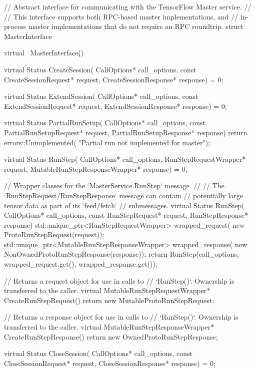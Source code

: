 \begin{content}
\begin{leftbar}
\begin{c++}
// Abstract interface for communicating with the TensorFlow Master service.
//
// This interface supports both RPC-based master implementations, and
// in-process master implementations that do not require an RPC roundtrip.
struct MasterInterface {
  virtual ~MasterInterface() {}
  
  virtual Status CreateSession(
      CallOptions* call_options,
      const CreateSessionRequest* request,
      CreateSessionResponse* response) = 0;

  virtual Status ExtendSession(
      CallOptions* call_options,
      const ExtendSessionRequest* request,
      ExtendSessionResponse* response) = 0;

  virtual Status PartialRunSetup(
      CallOptions* call_options,
      const PartialRunSetupRequest* request,
      PartialRunSetupResponse* response) {
    return errors::Unimplemented(
      "Partial run not implemented for master");
  }

  virtual Status RunStep(
      CallOptions* call_options,
      RunStepRequestWrapper* request,
      MutableRunStepResponseWrapper* response) = 0;

  // Wrapper classes for the `MasterService.RunStep` message.
  //
  // The `RunStepRequest/RunStepResponse` message can contain 
  // potentially large tensor data as part of its `feed/fetch` 
  // submessages.
  virtual Status RunStep(
    CallOptions* call_options,
    const RunStepRequest* request,
    RunStepResponse* response) {
    std::unique_ptr<RunStepRequestWrapper> wrapped_request(
        new ProtoRunStepRequest(request));
    std::unique_ptr<MutableRunStepResponseWrapper> wrapped_response(
        new NonOwnedProtoRunStepResponse(response));
    return RunStep(call_options, 
        wrapped_request.get(), 
        wrapped_response.get());
  }

  // Returns a request object for use in calls to
  // `RunStep()`. Ownership is transferred to the caller.
  virtual MutableRunStepRequestWrapper* CreateRunStepRequest() {
    return new MutableProtoRunStepRequest;
  }

  // Returns a response object for use in calls to
  // `RunStep()`. Ownership is transferred to the caller.
  virtual MutableRunStepResponseWrapper* CreateRunStepResponse() {
    return new OwnedProtoRunStepResponse;
  }

  virtual Status CloseSession(
    CallOptions* call_options,
    const CloseSessionRequest* request,
    CloseSessionResponse* response) = 0;

}
\end{c++}
\end{leftbar}
\end{content}
